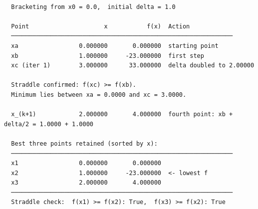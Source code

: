 \begin{verbatim}

  Bracketing from x0 = 0.0,  initial delta = 1.0

  Point                     x           f(x)  Action
  ──────────────────────────────────────────────────────────────
  xa                 0.000000       0.000000  starting point
  xb                 1.000000     -23.000000  first step
  xc (iter 1)        3.000000      33.000000  delta doubled to 2.00000

  Straddle confirmed: f(xc) >= f(xb).
  Minimum lies between xa = 0.0000 and xc = 3.0000.

  x_(k+1)            2.000000       4.000000  fourth point: xb + delta/2 = 1.0000 + 1.0000

  Best three points retained (sorted by x):
  ──────────────────────────────────────────────────────────────
  x1                 0.000000       0.000000
  x2                 1.000000     -23.000000  <- lowest f
  x3                 2.000000       4.000000
  ──────────────────────────────────────────────────────────────
  Straddle check:  f(x1) >= f(x2): True,  f(x3) >= f(x2): True
\end{verbatim}
